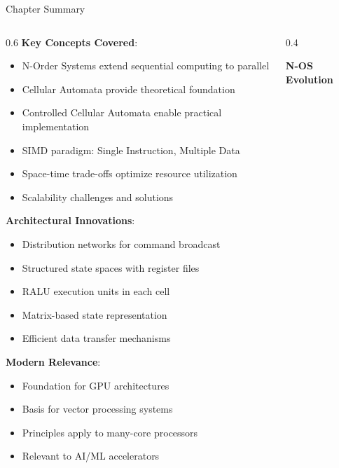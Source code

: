 \documentclass[aspectratio=169]{beamer}
\newcommand{\concept}[1]{\textbf{\color{darkblue}#1}}
\begin{document}
\begin{frame}{Chapter Summary}
\begin{columns}
\begin{column}{0.6\textwidth}
\concept{Key Concepts Covered}:
\begin{itemize}
\item N-Order Systems extend sequential computing to parallel
\item Cellular Automata provide theoretical foundation
\item Controlled Cellular Automata enable practical implementation
\item SIMD paradigm: Single Instruction, Multiple Data
\item Space-time trade-offs optimize resource utilization
\item Scalability challenges and solutions
\end{itemize}

\vspace{0.3cm}
\concept{Architectural Innovations}:
\begin{itemize}
\item Distribution networks for command broadcast
\item Structured state spaces with register files
\item RALU execution units in each cell
\item Matrix-based state representation
\item Efficient data transfer mechanisms
\end{itemize}

\vspace{0.3cm}
\concept{Modern Relevance}:
\begin{itemize}
\item Foundation for GPU architectures
\item Basis for vector processing systems
\item Principles apply to many-core processors
\item Relevant to AI/ML accelerators
\end{itemize}
\end{column}
\begin{column}{0.4\textwidth}
\begin{center}
\textbf{N-OS Evolution}
\vspace{0.3cm}

\end{center}
\end{column}
\end{columns}
\end{frame}
\end{document}
